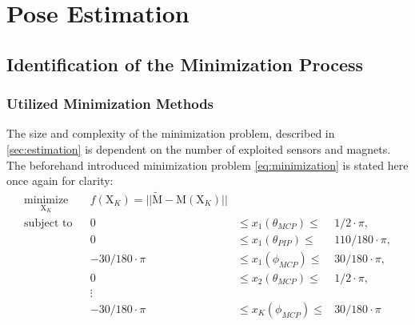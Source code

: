\section{Pose Estimation} \label{sec:estimationRes}

\subsection{Identification of the Minimization Process} \label{subsec:resSim}

\subsubsection{Utilized Minimization Methods} \label{subsubsec:miniMethod}

The size and complexity of the minimization problem, described in \ref{sec:estimation} is dependent on the number of exploited sensors and magnets. The beforehand introduced minimization problem \ref{eq:minimization} is stated here once again for clarity:
\begin{equation*} \label{eq:minimization}
\begin{aligned}
\underset{\mathrm{X}_K}{\text{minimize}} & & f(\mathrm{X}_K) = || \tilde{\mathrm{M}} - \mathrm{M}(\mathrm{X}_K) ||\\
\text{subject to} & & 0 & \leq {x}_1(\theta_{MCP}) \leq & 1/2 \cdot \pi, \\
				  & & 0 & \leq {x}_1(\theta_{PIP})  \leq & 110/180 \cdot \pi, \\
				  & & -30/180 \cdot \pi & \leq {x}_1(\phi_{MCP}) \leq & 30/180 \cdot \pi, \\
				  & & 0 & \leq {x}_2(\theta_{MCP})  \leq & 1/2 \cdot \pi, \\
				  & & \vdots \\
				  & & -30/180 \cdot \pi & \leq {x}_K(\phi_{MCP}) \leq & 30/180 \cdot \pi
\end{aligned}
\end{equation*}
